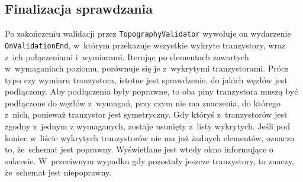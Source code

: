

\subsection{Finalizacja sprawdzania}
\label{subsec:finalizacja_sprawdzania}

Po zakończeniu walidacji przez \texttt{TopographyValidator} wywołuje on wydarzenie \texttt{OnValidationEnd},
w~którym przekazuje wszystkie wykryte tranzystory, wraz z~ich połączeniami i~wymiarami.
Iterując po elementach zawartych w~wymaganiach poziomu,
porównuje się je z~wykrytymi tranzystorami.
Prócz typu czy wymiaru tranzystora, istotne jest sprawdzenie, do jakich węzłów jest podłączony.
Aby podłączenia były poprawne, to oba piny tranzystora muszą być podłączone do węzłów z~wymagań,
przy czym nie ma znaczenia,
do którego z~nich, ponieważ tranzystor jest symetryczny.
Gdy któryś z~tranzystorów jest zgodny z~jednym z wymaganych, zostaje usunięty z~listy wykrytych.
Jeśli pod koniec w~liście wykrytych tranzystorów nie ma już żadnych elementów,
oznacza to, że~schemat jest poprawny.
Wyświetlane jest wtedy okno informujące o sukcesie.
W~przeciwnym wypadku gdy pozostały jeszcze tranzystory, to znaczy, że~schemat jest niepoprawny.\\